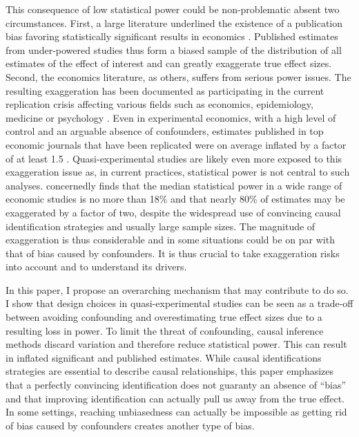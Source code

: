 			This consequence of low statistical power could be non-problematic absent two circumstances. First, a large literature underlined the existence of a publication bias favoring statistically significant results in economics \citep[for instance]{rosenthal_file_1979, andrews_identification_2019, abadie_statistical_2020, brodeur_methods_2020}. Published estimates from under-powered studies thus form a biased sample of the distribution of all estimates of the effect of interest and can greatly exaggerate true effect sizes. Second, the economics literature, as others, suffers from serious power issues. The resulting exaggeration has been documented as participating in the current replication crisis affecting various fields such as economics, epidemiology, medicine or psychology \citep{button_power_2013, open_science_collaboration_estimating_2015, camerer_evaluating_2016, chang_is_2022}. Even in experimental economics, with a high level of control and an arguable absence of confounders, estimates published in top economic journals that have been replicated were on average inflated by a factor of at least 1.5 \citep{camerer_evaluating_2016}. Quasi-experimental studies are likely even more exposed to this exaggeration issue as, in current practices, statistical power is not central to such analyses. \cite{ioannidis_power_2017} concernedly finds that the median statistical power in a wide range of economic studies is no more than 18\% and that nearly 80\% of estimates may be exaggerated by a factor of two, despite the widespread use of convincing causal identification strategies and usually large sample sizes. The magnitude of exaggeration is thus considerable and in some situations could be on par with that of bias caused by confounders. It is thus crucial to take exaggeration risks into account and to understand its drivers.%
			
			In this paper, I propose an overarching mechanism that may contribute to do so. I show that design choices in quasi-experimental studies can be seen as a trade-off between avoiding confounding and overestimating true effect sizes due to a resulting loss in power. To limit the threat of confounding, causal inference methods discard variation and therefore reduce statistical power. This can result in inflated significant and published estimates. While causal identifications strategies are essential to describe causal relationships, this paper emphasizes that a perfectly convincing identification does not guaranty an absence of ``bias'' and that improving identification can actually pull us away from the true effect. In some settings, reaching unbiasedness can actually be impossible as getting rid of bias caused by confounders creates another type of bias. 
			

